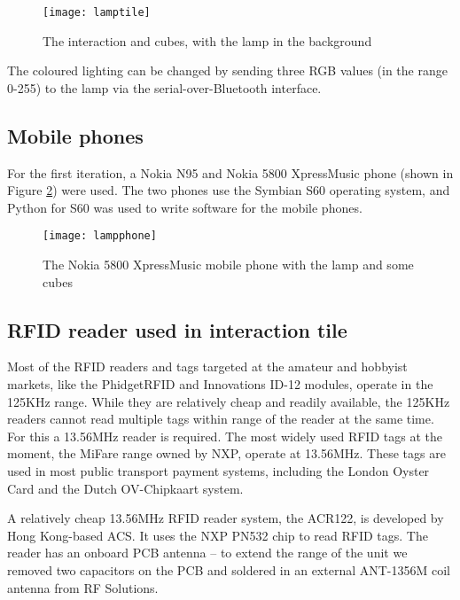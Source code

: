 \begin{figure}[bth]
\centering
\texttt{[image: lamptile]}
\caption{The interaction and cubes, with the lamp in the background}
\label{lamptile}
\end{figure}

The coloured lighting can be changed by sending three RGB values (in the range 0-255) to the lamp via the serial-over-Blue\-tooth interface.

\subsection{Mobile phones}

For the first iteration, a Nokia N95 and Nokia 5800 XpressMusic phone (shown in Figure \ref{lampphone}) were used. The two phones use the Symbian S60 operating system, and Python for S60 was used to write software for the mobile phones.

\begin{figure}[bth]
\centering
\texttt{[image: lampphone]}
\caption{The Nokia 5800 XpressMusic mobile phone with the lamp and some cubes}
\label{lampphone}
\end{figure}

\subsection{RFID reader used in interaction tile}

Most of the \ac{RFID} readers and tags targeted at the amateur and hobbyist markets, like the PhidgetRFID and Innovations ID-12 modules, operate in the 125KHz range. While they are relatively cheap and readily available, the 125KHz readers cannot read multiple tags within range of the reader at the same time. For this a 13.56MHz reader is required. The most widely used \ac{RFID} tags at the moment, the MiFare range owned by NXP, operate at 13.56MHz. These tags are used in most public transport payment systems, including the London Oyster Card and the Dutch OV-Chipkaart system.

A relatively cheap 13.56MHz \ac{RFID} reader system, the ACR122, is developed by Hong Kong-based \ac{ACS}. It uses the NXP PN532 chip to read \ac{RFID} tags.  The reader has an onboard PCB antenna -- to extend the range of the unit we removed two capacitors on the PCB and soldered in an external ANT-1356M coil antenna from RF Solutions.



